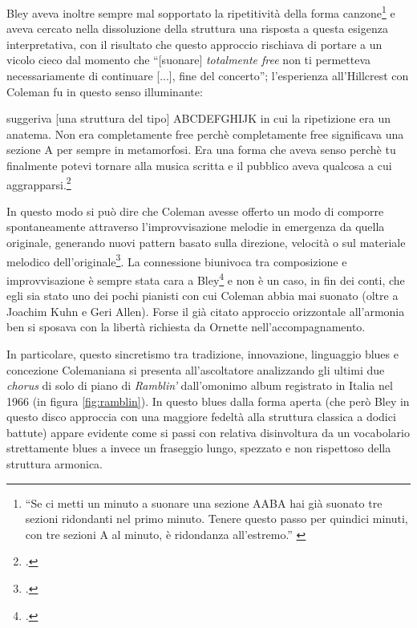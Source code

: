 Bley aveva inoltre sempre mal sopportato la ripetitività della forma canzone\footnote{``{Se ci metti un minuto a suonare una sezione AABA hai già suonato tre sezioni ridondanti nel primo minuto. Tenere questo passo per quindici minuti, con tre sezioni A al minuto, è ridondanza all'estremo}.'' \cite[25]{stopping}} e aveva cercato nella dissoluzione della struttura una risposta a questa esigenza interpretativa, con il risultato che questo approccio rischiava di portare a un vicolo cieco dal momento che ``[suonare] \textit{totalmente free} non ti permetteva necessariamente di continuare [...], fine del concerto''; l'esperienza all'Hillcrest con Coleman fu in questo senso illuminante: 
\begin{fquote}
	suggeriva [una struttura del tipo] ABCDEFGHIJK in cui la ripetizione era un anatema. Non era completamente free perchè completamente free significava una sezione A per sempre in metamorfosi. Era una forma che aveva senso perchè tu finalmente potevi tornare alla musica scritta e il pubblico aveva qualcosa a cui aggrapparsi.\footcite{hamilton}
\end{fquote}
In questo modo si può dire che Coleman avesse offerto un modo di comporre spontaneamente attraverso l'improvvisazione melodie in emergenza da quella originale, generando nuovi pattern basato sulla direzione, velocità o sul materiale melodico dell'originale\footcite[305]{gluck}. La connessione biunivoca tra composizione e improvvisazione è sempre stata cara a Bley\footcite[22]{cappelletti} e non è un caso, in fin dei conti, che egli sia stato uno dei pochi pianisti con cui Coleman abbia mai suonato (oltre a Joachim Kuhn e Geri Allen). Forse il già citato approccio orizzontale all'armonia ben si sposava con la libertà richiesta da Ornette nell'accompagnamento.\par
In particolare, questo sincretismo tra tradizione, innovazione, linguaggio blues e concezione Colemaniana si presenta all'ascoltatore analizzando gli ultimi due \textit{chorus} di solo di piano di \textit{Ramblin'} dall'omonimo album registrato in Italia nel 1966 (in figura \ref{fig:ramblin}). In questo blues dalla forma aperta (che però Bley in questo disco approccia con una maggiore fedeltà alla struttura classica a dodici battute) appare evidente come si passi con relativa disinvoltura da un vocabolario strettamente blues a invece un fraseggio lungo, spezzato e non rispettoso della struttura armonica. \par 
